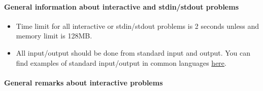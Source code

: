 \hypertarget{info-sheet}{}
\paragraph{General information about interactive and stdin/stdout problems}
\begin{itemize}
    \item Time limit for all interactive or stdin/stdout problems is 2 seconds unless and memory limit is 128MB.
    \item All input/output should be done from standard input and output.
    You can find examples of standard input/output in common languages \href{http://ejudge.rau.am/help.html}{here}.
\end{itemize}

\paragraph{General remarks about interactive problems}
\hypertarget{info-interactive}{}
